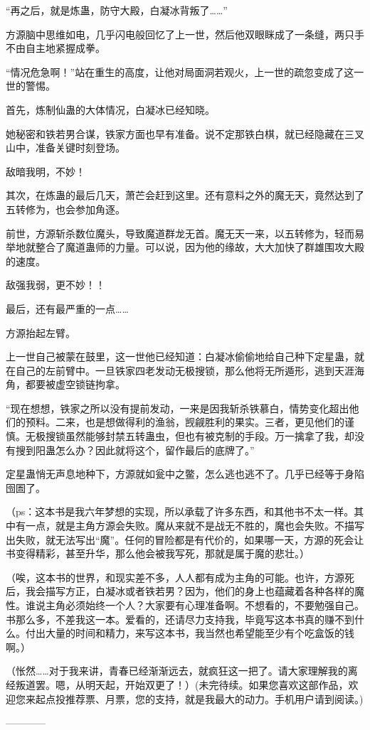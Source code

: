 \begin{this_body}
“再之后，就是炼蛊，防守大殿，白凝冰背叛了……”

方源脑中思维如电，几乎闪电般回忆了上一世，然后他双眼眯成了一条缝，两只手不由自主地紧握成拳。

“情况危急啊！”站在重生的高度，让他对局面洞若观火，上一世的疏忽变成了这一世的警惕。

首先，炼制仙蛊的大体情况，白凝冰已经知晓。

她秘密和铁若男合谋，铁家方面也早有准备。说不定那铁白棋，就已经隐藏在三叉山中，准备关键时刻登场。

敌暗我明，不妙！

其次，在炼蛊的最后几天，萧芒会赶到这里。还有意料之外的魔无天，竟然达到了五转修为，也会参加角逐。

前世，方源斩杀数位魔头，导致魔道群龙无首。魔无天一来，以五转修为，轻而易举地就整合了魔道蛊师的力量。可以说，因为他的缘故，大大加快了群雄围攻大殿的速度。

敌强我弱，更不妙！！

最后，还有最严重的一点……

方源抬起左臂。

上一世自己被蒙在鼓里，这一世他已经知道：白凝冰偷偷地给自己种下定星蛊，就在自己的左前臂中。一旦铁家四老发动无极搜锁，那么他将无所遁形，逃到天涯海角，都要被虚空锁链拘拿。

“现在想想，铁家之所以没有提前发动，一来是因我斩杀铁慕白，情势变化超出他们的预料。二来，也是想做得利的渔翁，觊觎胜利的果实。三者，更见他们的谨慎。无极搜锁虽然能够封禁五转蛊虫，但也有被克制的手段。万一擒拿了我，却没有搜到阳蛊怎么办？因此就将这个，留作最后的底牌了。”

定星蛊悄无声息地种下，方源就如瓮中之鳖，怎么逃也逃不了。几乎已经等于身陷囹圄了。

（ps：这本书是我六年梦想的实现，所以承载了许多东西，和其他书不太一样。其中有一点，就是主角方源会失败。魔从来就不是战无不胜的，魔也会失败。不描写出失败，就无法写出“魔”。任何的冒险都是有代价的，如果哪一天，方源的死会让书变得精彩，甚至升华，那么他会被我写死，那就是属于魔的悲壮。）

（唉，这本书的世界，和现实差不多，人人都有成为主角的可能。也许，方源死后，我会描写方正，白凝冰或者铁若男？因为，他们的身上也蕴藏着各种各样的魔性。谁说主角必须始终一个人？大家要有心理准备啊。不想看的，不要勉强自己。书那么多，不差我这一本。爱看的，还请尽力支持我，毕竟写这本书真的赚不到什么。付出大量的时间和精力，来写这本书，我当然也希望能至少有个吃盒饭的钱啊。）

（怅然……对于我来讲，青春已经渐渐远去，就疯狂这一把了。请大家理解我的离经叛道罢。嗯，从明天起，开始双更了！）(未完待续。如果您喜欢这部作品，欢迎您来起点投推荐票、月票，您的支持，就是我最大的动力。手机用户请到阅读。)

------------

\end{this_body}

